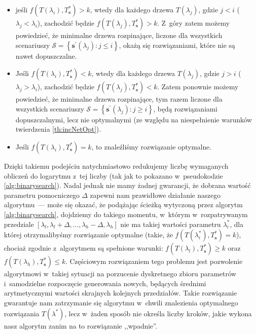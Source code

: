 \begin{itemize}
	\item jeśli $f \left( T \left( \lambda_{i} \right), T^{\ast}_{\textbf{s}} \right) > k$, wtedy dla każdego drzewa $T \left( \lambda_{j} \right)$, gdzie $j < i$ ($\lambda_{j} < \lambda_{i}$), zachodzić będzie $f \left( T \left( \lambda_{j} \right), T^{\ast}_{\textbf{s}} \right) > k$.
	Z~góry zatem możemy powiedzieć, że minimalne drzewa rozpinające, liczone dla wszystkich scenariuszy $\mathcal{S} = \left\{ \textbf{s}^{\prime} \left( \lambda_{j} \right) : j \leqslant i \right\}$, okażą się rozwiązaniami, które nie są nawet dopuszczalne.
	\item Jeśli $f \left( T \left( \lambda_{i} \right), T^{\ast}_{\textbf{s}} \right) < k$, wtedy dla każdego drzewa $T \left( \lambda_{j} \right)$, gdzie $j > i$ ($\lambda_{j} > \lambda_{i}$), zachodzić będzie $f \left( T \left( \lambda_{j} \right), T^{\ast}_{\textbf{s}} \right) < k$.
	Zatem ponownie możemy powiedzieć, że minimalne drzewa rozpinające, tym razem liczone dla wszystkich scenariuszy $\mathcal{S} = \left\{ \textbf{s}^{\prime} \left( \lambda_{j} \right) : j \geqslant i \right\}$, będą rozwiązaniami dopuszczalnymi, lecz nie optymalnymi (ze względu na niespełnienie warunków twierdzenia \ref{th:incNetOpt}).
	\item Jeśli $f \left( T \left( \lambda_{i} \right), T^{\ast}_{\textbf{s}} \right) = k$, to znaleźliśmy rozwiązanie optymalne.
\end{itemize}

Dzięki takiemu podejściu natychmiastowo redukujemy liczbę wymaganych obliczeń do logarytmu z~tej liczby (tak jak to pokazano w~pseudokodzie \ref{alg:binarysearch}).
Nadal jednak nie mamy żadnej gwarancji, że dobrana wartość parametru pomocniczego $\Delta$ zapewni nam prawidłowe działanie naszego algorytmu~--- może się okazać, że podążając ścieżką wytyczoną przez algorytm \ref{alg:binarysearch}, dojdziemy do takiego momentu, w~którym w~rozpatrywanym przedziale $\left[ \lambda_{l}, \lambda_{l} + \Delta, \dots, \lambda_{h} - \Delta, \lambda_{h} \right]$ nie ma takiej wartości parametru $\lambda^{\ast}_{i}$, dla której otrzymalibyśmy rozwiązanie optymalne (takie, że $f \left( T \left( \lambda^{\ast}_{i} \right), T^{\ast}_{\textbf{s}} \right) = k$), chociaż zgodnie z~algorytmem są spełnione warunki: $f \left( T \left( \lambda_{l} \right), T^{\ast}_{\textbf{s}} \right) \geqslant k$ oraz $f \left( T \left( \lambda_{h} \right), T^{\ast}_{\textbf{s}} \right) \leqslant k$.
Częściowym rozwiązaniem tego problemu jest pozwolenie algorytmowi w~takiej sytuacji na porzucenie dyskretnego zbioru parametrów i~samodzielne rozpoczęcie generowania nowych, będących średnimi arytmetycznymi wartości skrajnych kolejnych przedziałów.
Takie rozwiązanie gwarantuje nam zatrzymanie się algorytmu w~chwili znalezienia optymalnego rozwiązania $T \left( \lambda^{\ast} \right)$, lecz w~żaden sposób nie określa liczby kroków, jakie wykona nasz algorytm zanim na to rozwiązanie ,,wpadnie''.

